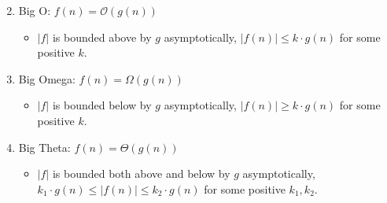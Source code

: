 \documentclass[10pt,a4paper]{article}
\begin{document}
\begin{enumerate}
\begin{equation}
    \end{equation}
    \item Big O: $f(n) = \mathcal{O}(g(n))$ 
      \begin{itemize}
        \item $|f|$ is bounded above by $g$ asymptotically, $|f(n)| \le k \cdot g(n)$ for some positive $k$. 
      \end{itemize}
    \item Big Omega: $f(n) = \mathcal{\Omega}(g(n))$ 
      \begin{itemize}
        \item $|f|$ is bounded below by $g$ asymptotically, $|f(n)| \ge k \cdot g(n)$ for some positive $k$. 
      \end{itemize}
    \item Big Theta: $f(n) = \mathcal{\Theta}(g(n))$ 
      \begin{itemize}
        \item $|f|$ is bounded both above and below by $g$ asymptotically, $k_1 \cdot g(n) \le |f(n)| \le k_2 \cdot g(n)$ for some positive $k_1, k_2$. 
      \end{itemize}
\end{enumerate}
\end{document}
